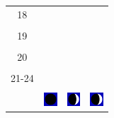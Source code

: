 \documentclass[a4paper,12pt, tikz]{scrartcl}
\begin{document}
\begin{tabularx}{\linewidth}{|c|X|X|X|}
      \hline
      18&   &       &    \\
        &   &       &    \\
      \hline
      19&   &       &    \\
        &   &       &    \\
      \hline
      20&   &       &    \\
        &   &       &    \\
      \hline
      21-24&   &       &    \\
        &   &       &    \\
      \hline  
      & \vspace{0.01cm} \centerline{\includegraphics[width=0.5cm]{moon_phases/Moon_phase_0.svg.png}} \vspace{0.1cm} & \vspace{0.01cm} \centerline{\includegraphics[width=0.5cm]{moon_phases/Moon_phase_1.svg.png}} \vspace{0.1cm} & \vspace{0.01cm} \centerline{\includegraphics[width=0.5cm]{moon_phases/Moon_phase_1.svg.png}} \vspace{0.1cm}\\
      \hline   
    \end{tabularx}




    \newpage

        \noindent
\end{document}
